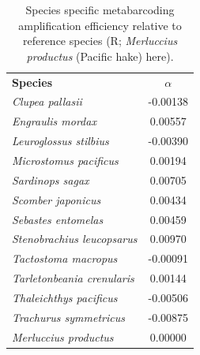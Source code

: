 \documentclass{article}
\begin{document}
\clearpage
\begin{table}\centering
\caption{Species specific metabarcoding amplification efficiency relative to reference species (R; \textit{Merluccius productus} (Pacific hake) here).}
    \begin{tabular}{lc}
\textbf{Species} & $\alpha$ \\
\textit{Clupea pallasii} &   -0.00138 \\
\textit{Engraulis mordax} &    0.00557 \\
\textit{Leuroglossus stilbius} &   -0.00390 \\
\textit{Microstomus pacificus} &    0.00194 \\
\textit{Sardinops sagax} &    0.00705 \\
\textit{Scomber japonicus} &    0.00434 \\
\textit{Sebastes entomelas} &    0.00459 \\
\textit{Stenobrachius leucopsarus} &    0.00970 \\
\textit{Tactostoma macropus} &   -0.00091 \\
\textit{Tarletonbeania crenularis} &    0.00144 \\
\textit{Thaleichthys pacificus} &   -0.00506 \\
\textit{Trachurus symmetricus} &   -0.00875 \\
\textit{Merluccius productus} &    0.00000 \\
    \end{tabular}
        \label{tab:alphas}
\end{table}
\clearpage


\end{document}
